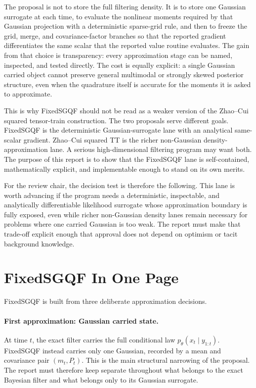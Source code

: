 \documentclass[11pt]{article}
\numberwithin{equation}{section}
\begin{document}
The proposal is not to store the full filtering density.  It is to store one
Gaussian surrogate at each time, to evaluate the nonlinear moments required by
that Gaussian projection with a deterministic sparse-grid rule, and then to
freeze the grid, merge, and covariance-factor branches so that the reported
gradient differentiates the same scalar that the reported value routine
evaluates.  The gain from that choice is transparency: every approximation stage
can be named, inspected, and tested directly.  The cost is equally explicit: a
single Gaussian carried object cannot preserve general multimodal or strongly
skewed posterior structure, even when the quadrature itself is accurate for the
moments it is asked to approximate.

This is why FixedSGQF should not be read as a weaker version of the Zhao--Cui
squared tensor-train construction.  The two proposals serve different goals.
FixedSGQF is the deterministic Gaussian-surrogate lane with an analytical
same-scalar gradient.  Zhao--Cui squared TT is the richer non-Gaussian
density-approximation lane.  A serious high-dimensional filtering program may
want both.  The purpose of this report is to show that the FixedSGQF lane is
self-contained, mathematically explicit, and implementable enough to stand on
its own merits.

For the review chair, the decision test is therefore the following.  This lane
is worth advancing if the program needs a deterministic, inspectable, and
analytically differentiable likelihood surrogate whose approximation boundary is
fully exposed, even while richer non-Gaussian density lanes remain necessary for
problems where one carried Gaussian is too weak.  The report must make that
trade-off explicit enough that approval does not depend on optimism or tacit
background knowledge.

\section{FixedSGQF In One Page}
\label{sec:p32-one-page}

FixedSGQF is built from three deliberate approximation decisions.

\paragraph{First approximation: Gaussian carried state.}
At time \(t\), the exact filter carries the full conditional law
\(p_\theta(x_t\mid y_{1:t})\).  FixedSGQF instead carries only one Gaussian,
recorded by a mean and covariance pair \((m_t,P_t)\).  This is the main
structural narrowing of the proposal.  The report must therefore keep separate
throughout what belongs to the exact Bayesian filter and what belongs only to
its Gaussian surrogate.
\end{document}
